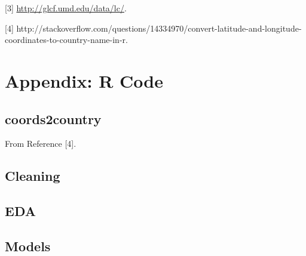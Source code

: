 \documentclass{article}
\begin{document}
\noindent \hypertarget{Ref3}{[3] \url{http://glcf.umd.edu/data/lc/}.}

\noindent \hypertarget{Ref4}{[4] http://stackoverflow.com/questions/14334970/convert-latitude-and-longitude-coordinates-to-country-name-in-r}.

\section{Appendix: R Code}

\subsection{coords2country}
From Reference [4].



\subsection{Cleaning}


\subsection{EDA}


\subsection{Models}

\end{document}

